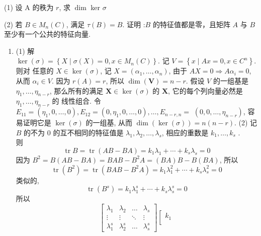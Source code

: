 \documentclass{article}
\begin{document}
(1) 设 $\mathrm{A}$ 的秩为 $r$, 求 $\operatorname{dim}$ ker $\sigma$

(2) 若 $B \in M_{n}(C)$, 满足 $\tau(B)=B .$ 证明 :$B$ 的特征值都是零，且矩阵 $A$ 与
$B$ 至少有一个公共的特征向量.
\begin{enumerate}[\qquad 证明：]
    \item (1) 解 \\
          $\operatorname{ker}(\sigma)=\left\{X \mid \sigma(X)=0, x \in M_{n}(C)\right\} .$ 记 $V=\left\{x \mid A x=0, x \in C^{n}\right\} .$ 则对
          任意的 $X \in \operatorname{ker}(\sigma)$, 记 $X=\left(\alpha_{1}, \ldots, \alpha_{n}\right)$, 由于 $A X=0 \Rightarrow A \alpha_{i}=0$, 从而
          $\alpha_{i} \in V$. 因为 $r(A)=r$, 所以 $\operatorname{dim}(\boldsymbol{V})=n-r .$ 假设 $V$ 的一组基是 $\eta_{1}, \ldots, \eta_{n-r}$,
          那么所有的满足 $\boldsymbol{X} \in \operatorname{ker}(\sigma)$ 的 $\boldsymbol{X}$, 它的每个列向量必然是 $\eta_{1}, \ldots, \eta_{n-r}$ 的
          线性组合. 令 $E_{11}=\left(\eta_{1}, 0, \ldots, 0\right), E_{12}=\left(0, \eta_{1}, 0, \ldots, 0\right), \ldots, E_{n-r, n}=$
          $\left(0,0, \ldots, \eta_{n-r}\right)$, 容易证明它是 $\operatorname{ker}(\sigma)$ 的一组基, 从而 $\operatorname{dim}(\operatorname{ker}(\sigma))=n(n-r) .$
          (2) 记 $B$ 的不为 0 的互不相同的特征值是 $\lambda_{1}, \lambda_{2}, \ldots, \lambda_{s}$, 相应的重数是 $k_{1}, \ldots, k_{s} $ . \\
          则
          $$
              \operatorname{tr} B=\operatorname{tr}(A B-B A)=k_{1} \lambda_{1}+\cdots+k_{s} \lambda_{s}=0
          $$
          因为 $B^{2}=B(A B-B A)=B A B-B^{2} A=(B A) B-B(B A)$, 所以
          $$
              \operatorname{tr}\left(B^{2}\right)=\operatorname{tr}\left(B A B-B^{2} A\right)=k_{1} \lambda_{1}^{2}+\cdots+k_{s} \lambda_{s}^{2}=0
          $$
          类似的,
          $$
              \operatorname{tr}\left(B^{s}\right)=k_{1} \lambda_{1}^{s}+\cdots+k_{s} \lambda_{s}^{s}=0
          $$
          所以
          $$
              \left[\begin{array}{cccc}
                      \lambda_{1}     & \lambda_{2}     & \ldots & \lambda_{s}     \\
                      \vdots          & \vdots          & \ddots & \vdots          \\
                      \lambda_{1}^{s} & \lambda_{2}^{s} & \ldots & \lambda_{s}^{s}
                  \end{array}\right]\left[\begin{array}{c}
                      k_{1}  \\

\end{array}$$
\end{enumerate}
\end{document}
